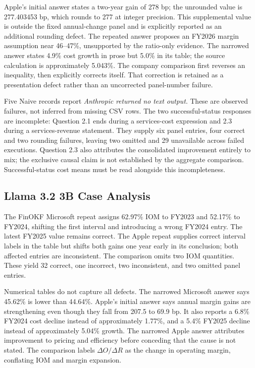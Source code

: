 \documentclass[letterpaper]{article} %
\begin{document}
Apple's initial answer states a two-year gain of 278 bp; the unrounded value is 277.403453 bp, which rounds to 277 at integer precision. This supplemental value is outside the fixed annual-change panel and is explicitly reported as an additional rounding defect. The repeated answer proposes an FY2026 margin assumption near 46--47\%, unsupported by the ratio-only evidence. The narrowed answer states 4.9\% cost growth in prose but 5.0\% in its table; the source calculation is approximately 5.043\%. The company comparison first reverses an inequality, then explicitly corrects itself. That correction is retained as a presentation defect rather than an uncorrected panel-number failure.

Five Naive records report \emph{Anthropic returned no text output.} These are observed failures, not inferred from missing CSV rows. The two successful-status responses are incomplete: Question 2.1 ends during a services-cost expression and 2.3 during a services-revenue statement. They supply six panel entries, four correct and two rounding failures, leaving two omitted and 29 unavailable across failed executions. Question 2.3 also attributes the consolidated improvement entirely to mix; the exclusive causal claim is not established by the aggregate comparison. Successful-status cost means must be read alongside this incompleteness.

\subsection{Llama 3.2 3B Case Analysis}
The FinOKF Microsoft repeat assigns 62.97\% IOM to FY2023 and 52.17\% to FY2024, shifting the first interval and introducing a wrong FY2024 entry. The latest FY2025 value remains correct. The Apple repeat supplies correct interval labels in the table but shifts both gains one year early in its conclusion; both affected entries are inconsistent. The comparison omits two IOM quantities. These yield 32 correct, one incorrect, two inconsistent, and two omitted panel entries.

Numerical tables do not capture all defects. The narrowed Microsoft answer says 45.62\% is lower than 44.64\%. Apple's initial answer says annual margin gains are strengthening even though they fall from 207.5 to 69.9 bp. It also reports a 6.8\% FY2024 cost decline instead of approximately 1.77\%, and a 5.4\% FY2025 decline instead of approximately 5.04\% growth. The narrowed Apple answer attributes improvement to pricing and efficiency before conceding that the cause is not stated. The comparison labels $\Delta O/\Delta R$ as the change in operating margin, conflating IOM and margin expansion.
\end{document}
